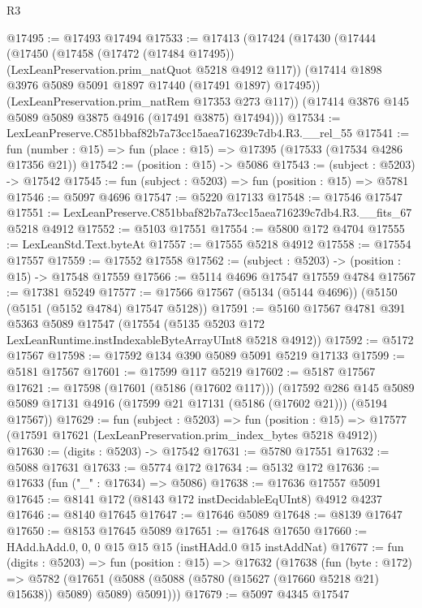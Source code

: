 \begin{lexlean}{R3}
\begin{coremodule}
@17495 := @17493 @17494
@17533 := @17413
    (@17424
      (@17430
        (@17444
          (@17450
            (@17458 (@17472 (@17484 @17495)) (LexLeanPreservation.prim_natQuot @5218 @4912 @117))
            (@17414 @1898 @3976 @5089 @5091 @1897 @17440 (@17491 @1897) @17495))
          (LexLeanPreservation.prim_natRem @17353 @273 @117))
        (@17414 @3876 @145 @5089 @5089 @3875 @4916 (@17491 @3875) @17494)))
@17534 := LexLeanPreserve.C851bbaf82b7a73cc15aea716239c7db4.R3.__rel_55
@17541 := fun (number : @15) => fun (place : @15) => @17395 (@17533 (@17534 @4286 @17356 @21))
@17542 := (position : @15) -> @5086
@17543 := (subject : @5203) -> @17542
@17545 := fun (subject : @5203) => fun (position : @15) => @5781
@17546 := @5097 @4696
@17547 := @5220 @17133
@17548 := @17546 @17547
@17551 := LexLeanPreserve.C851bbaf82b7a73cc15aea716239c7db4.R3.__fits_67 @5218 @4912
@17552 := @5103 @17551
@17554 := @5800 @172 @4704
@17555 := LexLeanStd.Text.byteAt
@17557 := @17555 @5218 @4912
@17558 := @17554 @17557
@17559 := @17552 @17558
@17562 := (subject : @5203) -> (position : @15) -> @17548 @17559
@17566 := @5114 @4696 @17547 @17559 @4784
@17567 := @17381 @5249
@17577 := @17566 @17567 (@5134 (@5144 @4696)) (@5150 (@5151 (@5152 @4784) @17547 @5128))
@17591 := @5160
    @17567
    @4781
    @391
    @5363
    @5089
    @17547
    (@17554 (@5135 @5203 @172 LexLeanRuntime.instIndexableByteArrayUInt8 @5218 @4912))
@17592 := @5172 @17567
@17598 := @17592 @134 @390 @5089 @5091 @5219 @17133
@17599 := @5181 @17567
@17601 := @17599 @117 @5219
@17602 := @5187 @17567
@17621 := @17598
    (@17601 (@5186 (@17602 @117)))
    (@17592
      @286
      @145
      @5089
      @5089
      @17131
      @4916
      (@17599 @21 @17131 (@5186 (@17602 @21)))
      (@5194 @17567))
@17629 := fun (subject : @5203) =>
  fun (position : @15) => @17577 (@17591 @17621 (LexLeanPreservation.prim_index_bytes @5218 @4912))
@17630 := (digits : @5203) -> @17542
@17631 := @5780 @17551
@17632 := @5088 @17631
@17633 := @5774 @172
@17634 := @5132 @172
@17636 := @17633 (fun ("_" : @17634) => @5086)
@17638 := @17636 @17557 @5091
@17645 := @8141 @172 (@8143 @172 instDecidableEqUInt8) @4912 @4237
@17646 := @8140 @17645
@17647 := @17646 @5089
@17648 := @8139 @17647
@17650 := @8153 @17645 @5089
@17651 := @17648 @17650
@17660 := HAdd.hAdd.{0, 0, 0} @15 @15 @15 (instHAdd.{0} @15 instAddNat)
@17677 := fun (digits : @5203) =>
  fun (position : @15) =>
  @17632
    (@17638
      (fun (byte : @172) =>
      @5782 (@17651 (@5088 (@5088 (@5780 (@15627 (@17660 @5218 @21) @15638)) @5089) @5089) @5091)))
@17679 := @5097 @4345 @17547

\end{coremodule}
\end{lexlean}
